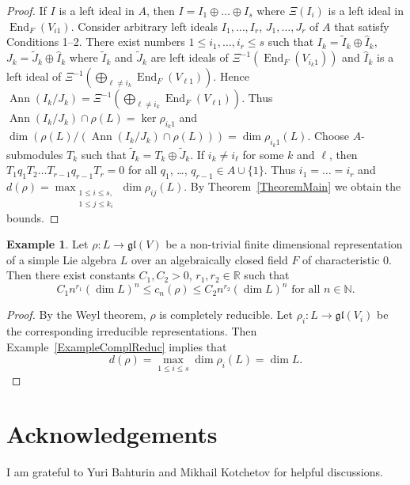 \documentclass[12pt, reqno, a4paper]{amsart}
\theoremstyle{plain}
\theoremstyle{remark}
\theoremstyle{definition}
\newtheorem{example}{Example}
\begin{document}
\begin{proof}
 If $I$ is a left ideal in $A$,
 then $I=I_1\oplus\ldots\oplus I_s$ where $\Xi(I_i)$
 is a left ideal in $\operatorname{End}_{F}(V_{i1})$.
 Consider arbitrary left ideals $I_1, \ldots, I_r$,
 $J_1, \ldots, J_r$ of $A$ that satisfy Conditions 1--2.
 There exist numbers $1\leqslant i_1, \ldots, i_r \leqslant s$
 such that $I_k = \tilde I_k \oplus \hat I_k$,
 $J_k = \tilde J_k \oplus \hat I_k$ where $\tilde I_k$ and
 $\tilde J_k$ are left ideals of $\Xi^{-1}(\operatorname{End}_F(V_{i_k1}))$
 and $\hat I_k$ is a left ideal of
 $\Xi^{-1}\left(\bigoplus_{\ell \ne i_k}\operatorname{End}_F(V_{\ell 1})\right)$.
 Hence $\operatorname{Ann}(I_k/J_k)=\Xi^{-1}\left(\bigoplus_{\ell \ne i_k}\operatorname{End}_F(V_{\ell 1})\right)$.
 Thus
 $\operatorname{Ann}(I_k/J_k) \cap \rho(L) = \ker\rho_{i_k1}$
 and $\dim(\rho(L)/(\operatorname{Ann}(I_k/J_k) \cap \rho(L))) = \dim \rho_{i_k1}(L)$.
 Choose $A$-submodules $T_k$ such that $\tilde I_k = T_k \oplus \tilde J_k$.
 If $i_k \ne i_\ell$ for some $k$ and $\ell$, then
 $T_1 q_1 T_2 \ldots T_{r-1} q_{r-1} T_r = 0$
 for all  $q_1$, \ldots, $q_{r-1} \in A \cup \{1\}$.
 Thus $i_1 = \ldots = i_r$ and $d(\rho) = \max_{\substack{1 \leqslant i \leqslant s,\\ 1 \leqslant j \leqslant k_i}} \dim \rho_{ij}(L)$.
  By Theorem~\ref{TheoremMain} we obtain the bounds.
\end{proof}

\begin{example}
Let $\rho \colon L \to \mathfrak{gl}(V)$ be a non-trivial finite dimensional
 representation of a simple Lie algebra $L$
over an algebraically closed field $F$ of characteristic $0$.
Then there exist constants $C_1, C_2 > 0$, $r_1, r_2 \in \mathbb R$
such that $$C_1 n^{r_1} (\dim L)^n \leqslant c_n(\rho) \leqslant C_2 n^{r_2} (\dim L)^n \text{ for all } n \in \mathbb N.$$
\end{example}
\begin{proof} By the Weyl theorem, $\rho$ is completely reducible.
Let $\rho_i \colon L \to \mathfrak{gl}(V_i)$ be the corresponding
irreducible representations. Then Example~\ref{ExampleComplReduc}
implies that $$d(\rho)=\max_{1 \leqslant i \leqslant s}\dim \rho_i(L)=\dim L.$$
\end{proof}

\section{Acknowledgements}

I am grateful to Yuri Bahturin and Mikhail Kotchetov for helpful
discussions.
\end{document}
